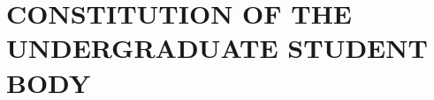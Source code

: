 \documentclass[12pt]{../misc/constitution}
\begin{document}
\begin{multicols}{2}
\tableofcontents
\end{multicols}
\endgroup

\newpage


\linenumbers
{}
\setcounter{page}{1}




\part{CONSTITUTION OF THE UNDERGRADUATE STUDENT BODY}






\label{PartA}















\end{document}
